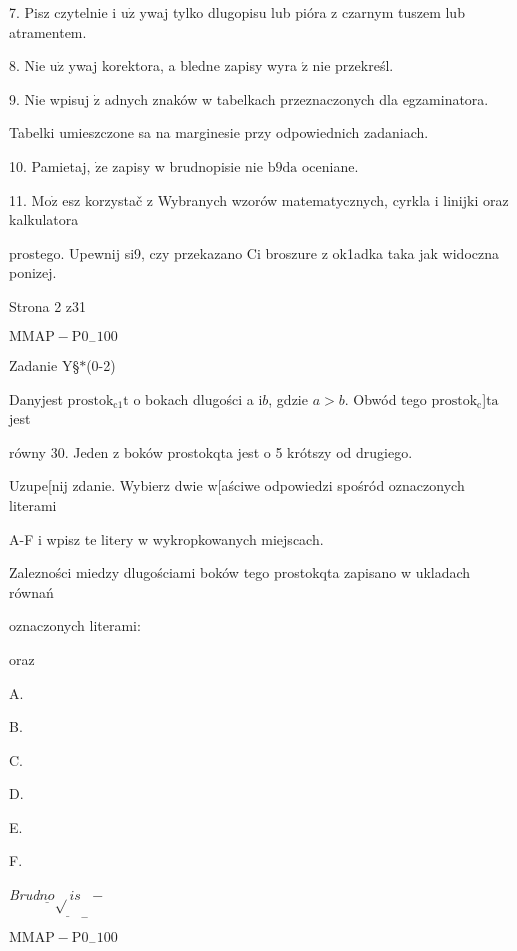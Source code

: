 \documentclass[a4paper,12pt]{article}
\begin{document}
7. Pisz czytelnie i $\mathrm{u}\dot{\mathrm{z}}$ ywaj tylko dlugopisu lub pióra z czarnym tuszem lub atramentem.

8. Nie $\mathrm{u}\dot{\mathrm{z}}$ ywaj korektora, a bledne zapisy wyra $\acute{\mathrm{z}}$ nie przekreśl.

9. Nie wpisuj $\dot{\mathrm{z}}$ adnych znaków w tabelkach przeznaczonych dla egzaminatora.

Tabelki umieszczone sa na marginesie przy odpowiednich zadaniach.

10. Pamietaj, $\dot{\mathrm{z}}\mathrm{e}$ zapisy w brudnopisie nie $\mathrm{b}9\mathrm{d}\mathrm{a}$ oceniane.

11. $\mathrm{M}\mathrm{o}\dot{\mathrm{z}}$ esz korzystač z Wybranych wzorów matematycznych, cyrkla i linijki oraz kalkulatora

prostego. Upewnij si9, czy przekazano Ci broszure z ok1adka taka jak widoczna ponizej.

Strona 2 z31

$\mathrm{M}\mathrm{M}\mathrm{A}\mathrm{P}-\mathrm{P}0_{-}100$





Zadanie Y\S$*$(0-2)

Danyjest $\mathrm{p}\mathrm{r}\mathrm{o}\mathrm{s}\mathrm{t}\mathrm{o}\mathrm{k}_{\mathrm{c}1}\mathrm{t}$ o bokach dlugości a $\mathrm{i} b$, gdzie $a>b$. Obwód tego $\mathrm{p}\mathrm{r}\mathrm{o}\mathrm{s}\mathrm{t}\mathrm{o}\mathrm{k}_{\mathrm{c}}$]$\mathrm{t}\mathrm{a}$ jest

równy 30. Jeden z boków prostokqta jest o 5 krótszy od drugiego.

Uzupe[nij zdanie. Wybierz dwie w[aściwe odpowiedzi spośród oznaczonych literami

A-F i wpisz te litery w wykropkowanych miejscach.

Zalezności miedzy dlugościami boków tego prostokqta zapisano w ukladach równań

oznaczonych literami:

oraz

A. 

B. 

C. 

D. 

E. 

F. 

{\it Brud}$\underline{no}\underline{\sqrt{}is}_{-} -$

$\mathrm{M}\mathrm{M}\mathrm{A}\mathrm{P}-\mathrm{P}0_{-}100$
\end{document}
